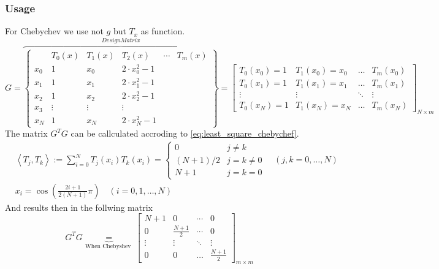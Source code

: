 \subsubsection{Usage}
For Chebychev we use not $g$ but $T_x$ as function.
$$
G=\overbrace{
\left\{\begin{array}{c|ccccc}
 & T_0(x) & T_1(x) & T_2(x) &\cdots&T_m(x)\\
\hline 
x_0 & 1 & x_0 & 2\cdot x_0^2-1 \\
x_1 & 1 & x_1 & 2\cdot x_1^2-1 \\
x_2 & 1 & x_2 & 2\cdot x_2^2-1 \\
x_3 &  \vdots&\vdots&\vdots \\
x_N &  1 & x_N & 2\cdot x_N^2-1
\end{array}\right\}}^{Design Matrix}
=\left[\begin{array}{cccc}T_{0}\left(x_{0}\right)=1 & T_{1}\left(x_{0}\right)=x_{0} & \ldots & T_{m}\left(x_{0}\right) \\
T_{0}\left(x_{1}\right)=1 & T_{1}\left(x_{1}\right)=x_{1} & \ldots & T_{m}\left(x_{1}\right) \\
\vdots & \vdots & \ddots & \vdots \\
T_{0}\left(x_{N}\right)=1 & T_{1}\left(x_{N}\right)=x_{N} & \ldots & T_{m}\left(x_{N}\right)
\end{array}\right]_{N \times m}
$$
The matrix $G^{T}G$ can be callculated accroding to \autoref{eq:least_square_chebychef}.
\begin{equation}\label{eq:least_square_chebychef}
\begin{aligned}
&\left\langle T_j, T_k\right\rangle:=\sum_{i=0}^N T_j\left(x_i\right) T_k\left(x_i\right)=\left\{\begin{array}{cc}
0 & j \neq k \\
(N+1) / 2 & j=k \neq 0 \\
N+1 & j=k=0
\end{array} \quad(j, k=0, \ldots, N)\right. \\
&x_i=\cos \left(\frac{2 i+1}{2(N+1)} \pi\right) \quad(i=0,1, \ldots, N)
\end{aligned}
\end{equation}
And results then in the follwing matrix
$$
G^{T} G \underbrace{=}_{\text {When Chebyshev }}\left[\begin{array}{cccc}
N+1 & 0 & \cdots & 0 \\
0 & \frac{N+1}{2} & \cdots & 0 \\
\vdots & \vdots & \ddots & \vdots \\
0 & 0 & \ldots & \frac{N+1}{2}
\end{array}\right]_{m \times m}
$$
